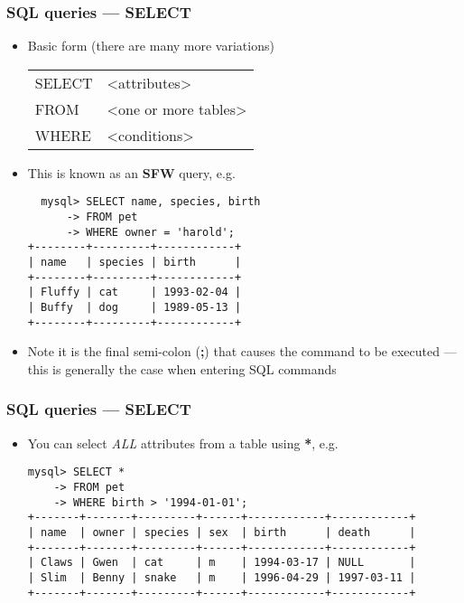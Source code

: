 \documentclass[hyperref={pdfpagelabels=false},svgnames,xcolor=table]{beamer}
\begin{document}
\begin{frame}[shrink=10, fragile]
  \frametitle{SQL queries --- SELECT}
  \begin{itemize}
    \item Basic form (there are many more variations)
      \begin{tabular}{>{\color{blue}}ll}
        SELECT & <attributes> \\
        FROM & <one or more tables> \\
        WHERE & <conditions>
      \end{tabular}
    \item This is known as an \textbf{SFW} query, e.g.\ 
  \begin{verbatim}
  mysql> SELECT name, species, birth
      -> FROM pet
      -> WHERE owner = 'harold';
+--------+---------+------------+
| name   | species | birth      |
+--------+---------+------------+
| Fluffy | cat     | 1993-02-04 |
| Buffy  | dog     | 1989-05-13 |
+--------+---------+------------+
  \end{verbatim}
\item Note it is the final semi-colon (\textbf{;}) that causes the
  command to be executed --- this is generally the case when entering
  SQL commands
  \end{itemize}
\end{frame}

\begin{frame}[fragile]
  \frametitle{SQL queries --- SELECT}
  \begin{itemize}
    \item You can select \emph{ALL} attributes from a table
      using \textbf{*}, e.g.
\begin{scriptsize}
\begin{verbatim}
mysql> SELECT *
    -> FROM pet
    -> WHERE birth > '1994-01-01';
+-------+-------+---------+------+------------+------------+
| name  | owner | species | sex  | birth      | death      |
+-------+-------+---------+------+------------+------------+
| Claws | Gwen  | cat     | m    | 1994-03-17 | NULL       |
| Slim  | Benny | snake   | m    | 1996-04-29 | 1997-03-11 |
+-------+-------+---------+------+------------+------------+
\end{verbatim}
\end{scriptsize}
  \end{itemize}
\end{frame}
\end{document}
